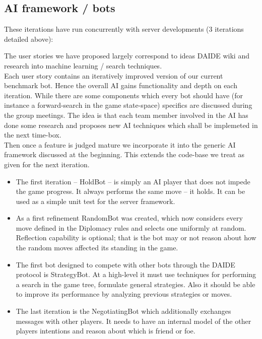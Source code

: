 \documentclass[pdftex,12pt,a4paper]{report}
\begin{document}
\subsection{AI framework / bots}

These iterations have run concurrently with server developments (3
iterations detailed above):

The user stories we have proposed largely correspond to ideas DAIDE
wiki and research into machine learning / search techniques.  \\ Each
user story contains an iteratively improved version of our current
benchmark bot. Hence the overall AI gains functionality and depth on
each iteration. While there are some components which every bot should
have (for instance a forward-search in the game state-space) specifics
are discussed during the group meetings. The idea is that each team
member involved in the AI has done some research and proposes new AI
techniques which shall be implemeted in the next time-box.  \\ Then
once a feature is judged mature we incorporate it into the generic AI
framework discussed at the beginning. This extends the code-base we
treat as given for the next iteration.

\begin{itemize}
\item The first iteration -- HoldBot -- is simply an AI player that
  does not impede the game progress. It always performs the same move
  -- it holds.  It can be used as a simple unit test for the server
  framework.
\item As a first refinement RandomBot was created, which now
  considers every move defined in the Diplomacy rules and selects one
  uniformly at random.  Reflection capability is optional; that is the
  bot may or not reason about how the random moves affected its
  standing in the game.
\item The first bot designed to compete with other bots through the
  DAIDE protocol is StrategyBot. At a high-level it must use
  techniques for performing a search in the game tree, formulate
  general strategies. Also it should be able to improve its
  performance by analyzing previous strategies or moves.
\item The last iteration is the NegotiatingBot which additionally
  exchanges messages with other players. It needs to have an internal
  model of the other players intentions and reason about which is
  friend or foe.
\end{itemize}
\end{document}
